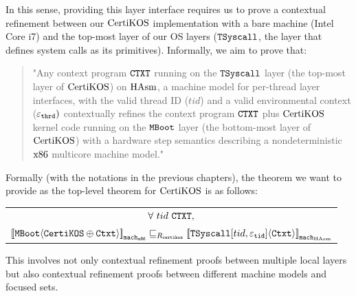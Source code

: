 In this sense, providing this layer interface requires us 
to prove a contextual refinement between our $\mathrm{CertiKOS}$ implementation with a bare machine (Intel Core i7) and 
the top-most layer of our OS layers (${\mathrm{\texttt{TSyscall}}}$, the layer that defines system calls as its primitives).
Informally, we aim to prove that:
\begin{quote}
"Any context program ${\mathrm{\texttt{CTXT}}}$ running on the ${\mathrm{\texttt{TSyscall}}}$ layer (the top-most layer of $\mathrm{CertiKOS}$) on $\mathrm{HAsm}$, a machine model for per-thread layer interfaces, with the valid thread ID ($tid$)
and a valid environmental context (${\varepsilon}_{{\mathrm{\texttt{thrd}}}})$ 
contextually refines the context program ${\mathrm{\texttt{CTXT}}}$ plus $\mathrm{CertiKOS}$ kernel code running on the ${\mathrm{\texttt{MBoot}}}$ layer (the bottom-most layer of $\mathrm{CertiKOS}$) with a hardware step semantics describing a nondeterministic $\mathrm{x86}$ multicore machine model."
\end{quote}
Formally (with the notations in the previous chapters), the theorem we want to provide as the top-level theorem for $\mathrm{CertiKOS}$ is as follows:
 \begin{center}
\begin{tabular}{c}
$\forall\ tid\  \codeinmath{CTXT},$\\
${[\![{{\mathrm{\texttt{MBoot}}}} \langle {{\mathrm{\texttt{CertiKOS}}} \oplus {\mathrm{\texttt{Ctxt}}}} \rangle]\!]}_{{\mathrm{\texttt{mach}}}_{{\mathrm{\texttt{x86}}}}} \sqsubseteq_{R_{{\mathrm{\texttt{certikos}}}}} {[\![{{\mathrm{\texttt{TSyscall}}}[tid, {\varepsilon}_{{\mathrm{\texttt{tid}}}}]} \langle {{\mathrm{\texttt{Ctxt}}}} \rangle]\!]}_{{{\mathrm{\texttt{mach}}}_{\mathrm{HAsm}}}}$\\
\end{tabular}
\end{center}
This involves not only contextual refinement proofs between multiple local layers but also contextual refinement proofs between
different machine models and focused sets.

